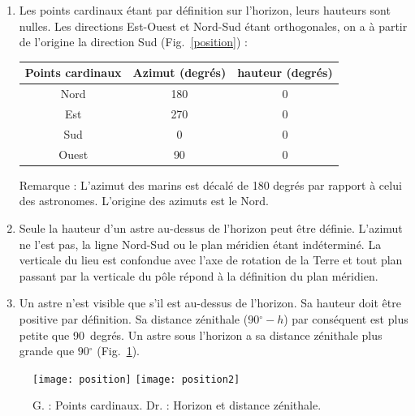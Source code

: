 \documentclass[a4paper,10pt]{report}
\renewcommand{\deg}{\ensuremath{^{\circ}}}
\begin{document}
\begin{Answer}
  \begin{enumerate}
  \item Les points cardinaux étant par définition sur l'horizon, leurs
    hauteurs sont nulles. Les directions Est-Ouest et Nord-Sud étant
    orthogonales, on a à partir de l'origine la direction Sud
    (Fig.~\ref{position}) :
    \begin{center}
      \begin{tabular}{|c|c|c|}
        \hline
        Points cardinaux & Azimut (degrés) & hauteur (degrés) \\ \hline
        Nord  & 180 & 0 \\ \hline
        Est   & 270 & 0 \\ \hline
        Sud   & 0   & 0 \\ \hline
        Ouest & 90  & 0 \\ \hline
      \end{tabular}
    \end{center}
    Remarque : L'azimut des marins est décalé de 180 degrés par rapport
    à celui des astronomes. L'origine des azimuts est le Nord.

  \item Seule la hauteur d'un astre au-dessus de l'horizon peut être
    définie. L'azimut ne l'est pas, la ligne Nord-Sud ou le plan
    méridien étant indéterminé. La verticale du lieu est confondue
    avec l'axe de rotation de la Terre et tout plan passant par la
    verticale du pôle répond à la définition du plan méridien.

  \item Un astre n'est visible que s'il est au-dessus de l'horizon. Sa
    hauteur doit être positive par définition. Sa distance zénithale
    ($90\deg - h$) par conséquent est plus petite que 90~degrés.  Un
    astre sous l'horizon a sa distance zénithale plus grande que
    $90\deg$ (Fig.~\ref{position2}).
  \end{enumerate}

  \begin{figure}[htp]
    \begin{center}
      \texttt{[image: position]}
      \texttt{[image: position2]}
    \end{center}
    \label{position}
    \label{position2}
    \caption{G. : Points cardinaux. Dr. : Horizon et distance zénithale.}
  \end{figure}
\end{Answer}
\end{document}
